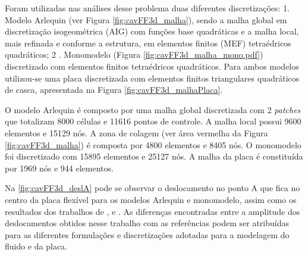 Foram utilizadas nas análises desse problema duas diferentes discretizações: 1. Modelo Arlequin (ver Figura \ref{fig:cavFF3d_malha}), sendo a malha global em discretização isogeométrica (AIG) com funções base quadráticas e a malha local, mais refinada e conforme a estrutura, em elementos finitos (MEF) tetraédricos quadráticos; 2 . Monomodelo (Figura \ref{fig:cavFF3d_malha_mono.pdf}) discretizado com elementos finitos tetraédricos quadráticos. Para ambos modelos utilizou-se uma placa discretizada com elementos finitos triangulares quadráticos de casca, apresentada na Figura \ref{fig:cavFF3d_malhaPlaca}.

\pagebreak

O modelo Arlequin é composto por uma malha global discretizada com 2 \textit{patches} que totalizam 8000 células e 11616 pontos de controle. A malha local possui 9600 elementos e 15129 nós. A zona de colagem (ver área vermelha da Figura \ref{fig:cavFF3d_malha}) é composta por 4800 elementos e 8405 nós.  O monomodelo foi discretizado com 15895 elementos e 25127 nós. A malha da placa é constituída por 1969 nós e 944 elementos.

Na \autoref{fig:cavFF3d_deslA} pode se observar o deslocamento no ponto A que fica no centro da placa flexível para os modelos Arlequin e monomodelo, assim como os resultados dos trabalhos de , e . As diferenças encontradas entre a amplitude dos deslocamentos obtidos nesse trabalho com as referências podem ser atribuídas para as diferentes formulações e discretizações adotadas para a modelagem do fluido e da placa.

